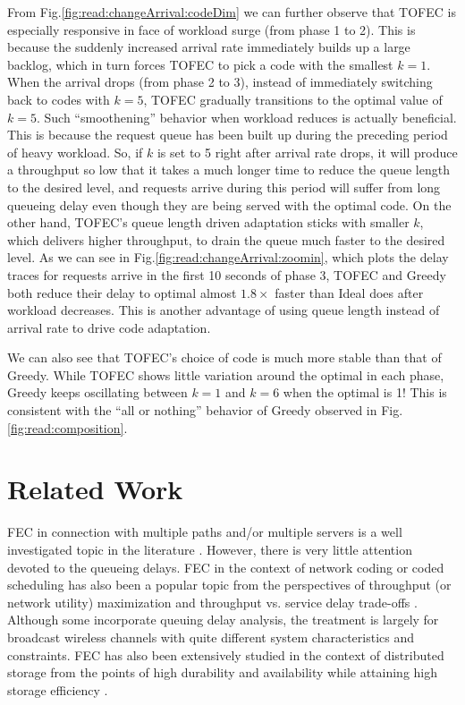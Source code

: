 \documentclass[journal]{IEEEtran}
\newcommand{\ourproposal}{TOFEC\xspace}
\begin{document}
From Fig.\ref{fig:read:changeArrival:codeDim} we can further observe that \ourproposal is especially responsive in face of workload surge (from phase 1 to 2). This is because the suddenly increased arrival rate immediately builds up a large backlog, which in turn forces \ourproposal to pick a code with the smallest $k=1$. When the arrival drops (from phase 2 to 3), instead of immediately switching back to codes with $k=5$, \ourproposal gradually transitions to the optimal value of $k=5$. Such ``smoothening'' behavior when workload reduces is actually beneficial. This is because the request queue has been built up during the preceding period of heavy workload. So, if $k$ is set to 5 right after arrival rate drops, it will produce a throughput so low that it takes a much longer time to reduce the queue length to the desired level, and requests arrive during this period will suffer from long queueing delay even though they are being served with the optimal code. On the other hand, \ourproposal's queue length driven adaptation sticks with smaller $k$, which delivers higher throughput, to drain the queue much faster to the desired level.  As we can see in Fig.\ref{fig:read:changeArrival:zoomin}, which plots the delay traces for requests arrive in the first 10 seconds of phase 3, \ourproposal and Greedy both reduce their delay to optimal almost $1.8\times$  faster than Ideal does after workload decreases. This is another advantage of using queue length instead of arrival rate to drive code adaptation.  


We can also see that \ourproposal's choice of code is much more stable than that of Greedy. 
While \ourproposal shows little variation around the optimal in each phase, Greedy keeps oscillating between $k=1$ and $k=6$ when the optimal is 1! This is consistent with the ``all or nothing'' behavior of Greedy observed in Fig.\ref{fig:read:composition}.







\section{Related Work}
\label{sec:related}

FEC in connection with multiple paths and/or multiple servers is a well investigated topic in the literature \cite{VickySharmaMPLOT,EminGabrielyanFEC,JohnByersAccessing,RSaadEvaluating}. However, there is very little attention devoted to the queueing delays. FEC in the context of network coding or coded scheduling has also been a popular topic from the perspectives of throughput (or network utility) maximization and throughput vs. service delay trade-offs \cite{Eryilmaz:2008:DTG:2263482.2273567,Yeownetworkcoding,Theodorosnetworkcoding, KozatScheduling}. Although some incorporate queuing delay analysis, the treatment is largely for broadcast wireless channels with quite different system characteristics and constraints.
FEC has also been extensively studied in the context of distributed storage from the points of high durability and availability while attaining high storage efficiency \cite{Dimakis:2010:NCD:1861840.1861868,Rodrigues_highavailability,Li:2010:TDR:1833515.1833884}. 
\end{document}
